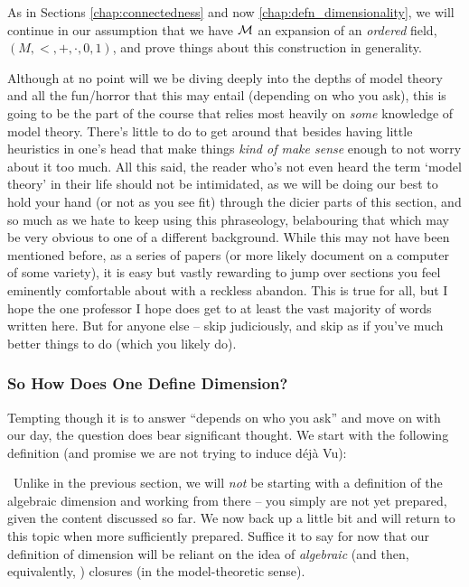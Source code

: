 \begin{svgraybox}
  As in Sections \ref{chap:connectedness} and now \ref{chap:defn_dimensionality}, we will continue in our assumption that we have $\mathcal{M}$ an \om expansion of an \emph{ordered} field, $(M, <, +, \cdot, 0, 1)$, and prove things about this construction in generality.
\end{svgraybox}

Although at no point will we be diving deeply into the depths of model theory and all the fun/horror that this may entail (depending on who you ask), this is going to be the part of the course that relies most heavily on \emph{some} knowledge of model theory. There's little to do to get around that besides having little heuristics in one's head that make things \emph{kind of make sense} enough to not worry about it too much. All this said, the reader who's not even heard the term `model theory' in their life should not be intimidated, as we will be doing our best to hold your hand (or not as you see fit) through the dicier parts of this section, and so much as we hate to keep using this phraseology, belabouring that which may be very obvious to one of a different background. While this may not have been mentioned before, as a series of papers (or more likely document on a computer of some variety), it is easy but vastly rewarding to jump over sections you feel eminently comfortable about with a reckless abandon. This is true for all, but I hope the one professor I hope does get to at least the vast majority of words written here. But for anyone else -- skip judiciously, and skip as if you've much better things to do (which you likely do).

\subsubsection{So How Does One Define Dimension?}
\label{sec:alg_dim}

\noindent Tempting though it is to answer ``depends on who you ask'' and move on with our day, the question does bear significant thought. We start with the following definition (and promise we are not trying to induce d\'ej\`a Vu):

\begin{definition}
  \
  Unlike in the previous section, we will \emph{not} be starting with a definition of the algebraic dimension and working from there -- you simply are not yet prepared, given the content discussed so far. We now back up a little bit and will return to this topic when more sufficiently prepared. Suffice it to say for now that our definition of dimension will be reliant on the idea of \emph{algebraic} (and then, equivalently, \emph{}) closures (in the model-theoretic sense).
  \label{defn:alg_dim_fake}
\end{definition}

